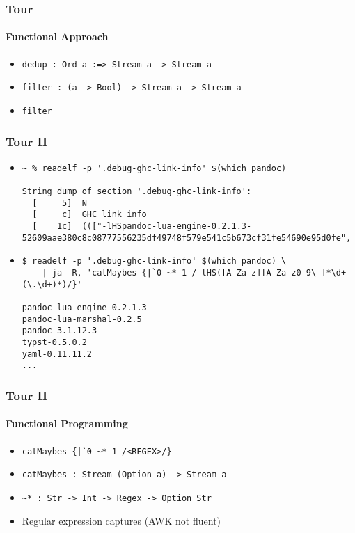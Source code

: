\documentclass{beamer}
\begin{document}
\begin{frame}[fragile]
  \frametitle{Tour}
  \framesubtitle{Functional Approach}
  \begin{itemize}
    \item \verb|dedup : Ord a :=> Stream a -> Stream a|
    \item \verb|filter : (a -> Bool) -> Stream a -> Stream a|
    \item \verb|filter| 
  \end{itemize}
\end{frame}

\begin{frame}[fragile]
  \frametitle{Tour II}
  \begin{itemize}
    \item
      \begin{verbatim}
~ % readelf -p '.debug-ghc-link-info' $(which pandoc)

String dump of section '.debug-ghc-link-info':
  [     5]  N
  [     c]  GHC link info
  [    1c]  ((["-lHSpandoc-lua-engine-0.2.1.3-52609aae380c8c08777556235df49748f579e541c5b673cf31fe54690e95d0fe",
      \end{verbatim}
    \item
      \begin{verbatim}
$ readelf -p '.debug-ghc-link-info' $(which pandoc) \
    | ja -R, 'catMaybes {|`0 ~* 1 /-lHS([A-Za-z][A-Za-z0-9\-]*\d+(\.\d+)*)/}'

pandoc-lua-engine-0.2.1.3
pandoc-lua-marshal-0.2.5
pandoc-3.1.12.3
typst-0.5.0.2
yaml-0.11.11.2
...
      \end{verbatim}
  \end{itemize}
\end{frame}

\begin{frame}[fragile]
  \frametitle{Tour II}
  \framesubtitle{Functional Programming}
  \begin{itemize}
    \item \verb,catMaybes {|`0 ~* 1 /<REGEX>/},
    \item \verb|catMaybes : Stream (Option a) -> Stream a|
    \item \verb|~* : Str -> Int -> Regex -> Option Str|
    \item Regular expression captures (AWK not fluent)
  \end{itemize}
\end{frame}
\end{document}
